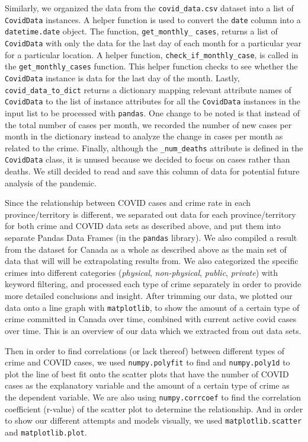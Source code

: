 \documentclass[fontsize=11pt]{article}
\begin{document}
Similarly, we organized the data from the \verb+covid_data.csv+ dataset into a list of \verb+CovidData+ instances. A helper function is used to convert the \verb+date+ column into a \verb+datetime.date+ object. The function, \verb+get_monthly_+ \verb+cases+, returns a list of \verb+CovidData+ with only the data for the last day of each month for a particular year for a particular location. A helper function, \verb+check_if_monthly_case+, is called in the \verb+get_monthly_cases+ function. This helper function checks to see whether the \verb+CovidData+ instance is data for the last day of the month. Lastly, \verb+covid_data_to_dict+ returns a dictionary mapping relevant attribute names of \verb+CovidData+ to the list of instance attributes for all the \verb+CovidData+ instances in the input list to be processed with \verb+pandas+. One change to be noted is that instead of the total number of cases per month, we recorded the number of new cases per month in the dictionary instead to analyze the change in cases per month as related to the crime. Finally, although the \verb+_num_deaths+ attribute is defined in the \verb+CovidData+ class, it is unused because we decided to focus on cases rather than deaths. We still decided to read and save this column of data for potential future analysis of the pandemic.

Since the relationship between COVID cases and crime rate in each province/territory is different, we separated out data for each province/territory for both crime and COVID data sets as described above, and put them into separate Pandas Data Frames (in the \verb+pandas+ library). We also compiled a result from the dataset for Canada as a whole as described above as the main set of data that will will be extrapolating results from. We also categorized the specific crimes into different categories (\textit{physical}, \textit{non-physical}, \textit{public}, \textit{private}) with keyword filtering, and processed each type of crime separately in order to provide more detailed conclusions and insight. After trimming our data, we plotted our data onto a line graph with \verb+matplotlib+, to show the amount of a certain type of crime committed in Canada over time, combined with current active covid cases over time. This is an overview of our data which we extracted from out data sets.

Then in order to find correlations (or lack thereof) between different types of crime and COVID cases, we used \verb+numpy.polyfit+ to find and \verb+numpy.poly1d+ to plot the line of best fit onto the scatter plots that have the number of COVID cases as the explanatory variable and the amount of a certain type of crime as the dependent variable. We are also using \verb+numpy.corrcoef+ to find the correlation coefficient (r-value) of the scatter plot to determine the relationship. And in order to show our different attempts and models visually, we used \verb+matplotlib.scatter+ and \verb+matplotlib.plot+.
\end{document}
